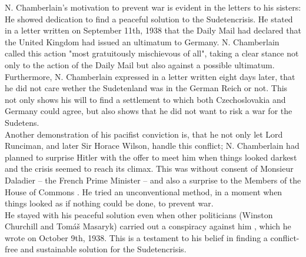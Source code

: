 \documentclass[10pt, a4papert, hidelinks]{article}
\begin{document}


N. Chamberlain's motivation to prevent war is evident in the letters to his sisters: He showed dedication to find a peaceful solution to the Sudetencrisis. He stated in a letter written on September 11th, 1938 that the Daily Mail had declared that the United Kingdom had issued an ultimatum to Germany. N. Chamberlain called this action "most gratuitously mischievous of all", taking a clear stance not only to the action of the Daily Mail but also against a possible ultimatum.\\
Furthermore, N. Chamberlain expressed in a letter written eight days later, that he did not care wether the Sudetenland was in the German Reich or not. This not only shows his will to find a settlement to which both Czechoslovakia and Germany could agree, but also shows that he did not want to risk a war for the Sudetens.\\
Another demonstration of his pacifist conviction is, that he not only let Lord Runciman, and later Sir Horace Wilson, handle this conflict; N. Chamberlain had planned to surprise Hitler with the offer to meet him when things looked darkest and the crisis seemed to reach its climax. This was without consent of Monsieur Daladier -- the French Prime Minister -- and also a surprise to the Members of the House of Commons \cite{voelkerbund_muenchener_abkommen_hermann_raschhofer}. He tried an unconventional method, in a moment when things looked as if nothing could be done, to prevent war.\\
He stayed with his peaceful solution even when other politicians (Winston Churchill and Tomáš Masaryk) carried out a conspiracy against him \cite{chamberlain_neville_2000}, which he wrote on October 9th, 1938. This is a testament to his belief in finding a conflict-free and sustainable solution for the Sudetencrisis.
\end{document}

